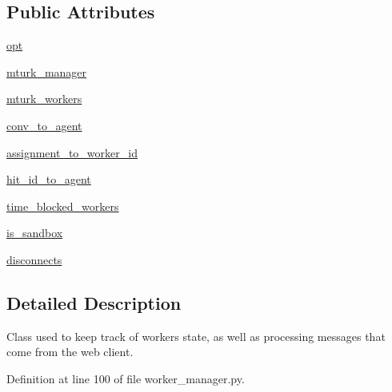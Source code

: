 \subsection*{Public Attributes}
\begin{DoxyCompactItemize}
\item 
\hyperlink{classparlai_1_1mturk_1_1core_1_1worker__manager_1_1WorkerManager_a69b6fcf739bcdaf914fe524772738309}{opt}
\item 
\hyperlink{classparlai_1_1mturk_1_1core_1_1worker__manager_1_1WorkerManager_a90e4c41010915289fa5e8e1fb0572623}{mturk\+\_\+manager}
\item 
\hyperlink{classparlai_1_1mturk_1_1core_1_1worker__manager_1_1WorkerManager_a52976ae5dca085ae8398305c36e781b9}{mturk\+\_\+workers}
\item 
\hyperlink{classparlai_1_1mturk_1_1core_1_1worker__manager_1_1WorkerManager_a878a7bb6afd1530ecc8cc8852a8990a6}{conv\+\_\+to\+\_\+agent}
\item 
\hyperlink{classparlai_1_1mturk_1_1core_1_1worker__manager_1_1WorkerManager_ad3bec2328ee19706027d1279e5910a22}{assignment\+\_\+to\+\_\+worker\+\_\+id}
\item 
\hyperlink{classparlai_1_1mturk_1_1core_1_1worker__manager_1_1WorkerManager_abff39f43090e885a3c8b74f4fcc06d55}{hit\+\_\+id\+\_\+to\+\_\+agent}
\item 
\hyperlink{classparlai_1_1mturk_1_1core_1_1worker__manager_1_1WorkerManager_aa51476aab479eae8096ae6097a8571f8}{time\+\_\+blocked\+\_\+workers}
\item 
\hyperlink{classparlai_1_1mturk_1_1core_1_1worker__manager_1_1WorkerManager_abd069a274bd03b3aeab20c3f788cf127}{is\+\_\+sandbox}
\item 
\hyperlink{classparlai_1_1mturk_1_1core_1_1worker__manager_1_1WorkerManager_a1fcba62024d92a25d76e0f106d76fd81}{disconnects}
\end{DoxyCompactItemize}


\subsection{Detailed Description}
\begin{DoxyVerb}Class used to keep track of workers state, as well as processing messages that come
from the web client.
\end{DoxyVerb}
 

Definition at line 100 of file worker\+\_\+manager.\+py.



